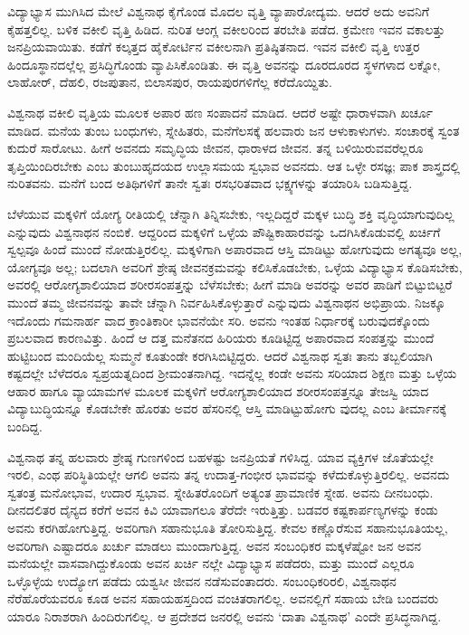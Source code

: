 ವಿದ್ಯಾಭ್ಯಾಸ ಮುಗಿಸಿದ ಮೇಲೆ ವಿಶ್ವನಾಥ ಕೈಗೊಂಡ ಮೊದಲ ವೃತ್ತಿ ವ್ಯಾಪಾರೋದ್ಯಮ. ಆದರೆ ಅದು ಅವನಿಗೆ ಕೈಹತ್ತಲಿಲ್ಲ. ಬಳಿಕ ವಕೀಲಿ ವೃತ್ತಿ ಹಿಡಿದ. ನುರಿತ ಆಂಗ್ಲ ವಕೀಲರಿಂದ ತರಬೇತಿ ಪಡೆದ. ಕ್ರಮೇಣ ಇವನ ವಕಾಲತ್ತು ಜನಪ್ರಿಯವಾಯಿತು. ಕಡೆಗೆ ಕಲ್ಕತ್ತದ ಹೈಕೋರ್ಟಿನ ವಕೀಲನಾಗಿ ಪ್ರತಿಷ್ಠಿತನಾದ. ಇವನ ವಕೀಲಿ ವೃತ್ತಿ ಉತ್ತರ ಹಿಂದೂಸ್ಥಾನದಲ್ಲೆಲ್ಲ ಪ್ರಸಿದ್ಧಿಗೊಂಡು ವ್ಯಾಪಿಸಿಕೊಂಡಿತು. ಈ ವೃತ್ತಿ ಅವನನ್ನು ದೂರದೂರದ ಸ್ಥಳಗಳಾದ ಲಕ್ನೋ, ಲಾಹೋರ್, ದೆಹಲಿ, ರಜಪುತಾನ, ಬಿಲಾಸಪುರ, ರಾಯಪುರಗಳಿಗೆಲ್ಲ ಕರೆದೊಯ್ದಿತು.

ವಿಶ್ವನಾಥ ವಕೀಲಿ ವೃತ್ತಿಯ ಮೂಲಕ ಅಪಾರ ಹಣ ಸಂಪಾದನೆ ಮಾಡಿದ. ಆದರೆ ಅಷ್ಟೇ ಧಾರಾಳವಾಗಿ ಖರ್ಚೂ ಮಾಡಿದ. ಮನೆಯ ತುಂಬ ಬಂಧುಗಳು, ಸ್ನೇಹಿತರು, ಮನೆಗೆಲಸಕ್ಕೆ ಹಲವಾರು ಜನ ಆಳುಕಾಳುಗಳು. ಸಂಚಾರಕ್ಕೆ ಸ್ವಂತ ಕುದುರೆ ಸಾರೋಟು. ಹೀಗೆ ಅವನದು ಸಮೃದ್ಧಿಯ ಜೀವನ, ಧಾರಾಳದ ಜೀವನ. ತನ್ನ ಬಳಿಯಿರುವವರೆಲ್ಲರೂ ತೃಪ್ತಿಯಿಂದಿರಬೇಕು ಎಂಬ ತುಂಬುಹೃದಯದ ಉಲ್ಲಾಸಮಯ ಸ್ವಭಾವ ಅವನದು. ಆತ ಒಳ್ಳೇ ರಸಜ್ಞ; ಪಾಕ ಶಾಸ್ತ್ರದಲ್ಲಿ ನುರಿತವನು. ಮನೆಗೆ ಬಂದ ಅತಿಥಿಗಳಿಗೆ ತಾನೇ ಸ್ವತಃ ರಸಭರಿತವಾದ ಭಕ್ಷ್ಯಗಳನ್ನು ತಯಾರಿಸಿ ಬಡಿಸುತ್ತಿದ್ದ.

ಬೆಳೆಯುವ ಮಕ್ಕಳಿಗೆ ಯೋಗ್ಯ ರೀತಿಯಲ್ಲಿ ಚೆನ್ನಾಗಿ ತಿನ್ನಿಸಬೇಕು, ಇಲ್ಲದಿದ್ದರೆ ಮಕ್ಕಳ ಬುದ್ಧಿ ಶಕ್ತಿ ವೃದ್ಧಿಯಾಗುವುದಿಲ್ಲ ಎನ್ನುವುದು ವಿಶ್ವನಾಥನ ನಂಬಿಕೆ. ಆದ್ದರಿಂದ ಮಕ್ಕಳಿಗೆ ಒಳ್ಳೆಯ ಪೌಷ್ಟಿಕಾಹಾರವನ್ನು ಒದಗಿಸಿಕೊಡುವಲ್ಲಿ ಖರ್ಚಿಗೆ ಸ್ವಲ್ಪವೂ ಹಿಂದೆ ಮುಂದೆ ನೋಡುತ್ತಿರಲಿಲ್ಲ. ಮಕ್ಕಳಿಗಾಗಿ ಅಪಾರವಾದ ಆಸ್ತಿ ಮಾಡಿಟ್ಟು ಹೋಗುವುದು ಅಗತ್ಯವೂ ಅಲ್ಲ, ಯೋಗ್ಯವೂ ಅಲ್ಲ; ಬದಲಾಗಿ ಅವರಿಗೆ ಶ್ರೇಷ್ಠ ಜೀವನಕ್ರಮವನ್ನು ಕಲಿಸಿಕೊಡಬೇಕು, ಒಳ್ಳೆಯ ವಿದ್ಯಾಭ್ಯಾಸ ಕೊಡಿಸಬೇಕು, ಅವರಲ್ಲಿ ಆರೋಗ್ಯಶಾಲಿಯಾದ ಶರೀರಸಂಪತ್ತನ್ನು ಬೆಳೆಸಬೇಕು; ಹೀಗೆ ಮಾಡಿ ಅವರನ್ನು ಅವರ ಪಾಡಿಗೆ ಬಿಟ್ಟುಬಿಟ್ಟರೆ ಮುಂದೆ ತಮ್ಮ ಜೀವನವನ್ನು ತಾವೇ ಚೆನ್ನಾಗಿ ನಿರ್ವಹಿಸಿಕೊಳ್ಳುತ್ತಾರೆ ಎನ್ನುವುದು ವಿಶ್ವನಾಥನ ಅಭಿಪ್ರಾಯ. ನಿಜಕ್ಕೂ ಇದೊಂದು ಗಮನಾರ್ಹ ವಾದ ಕ್ರಾಂತಿಕಾರೀ ಭಾವನೆಯೇ ಸರಿ. ಅವನು ಇಂತಹ ನಿರ್ಧಾರಕ್ಕೆ ಬರುವುದಕ್ಕೊಂದು ಪ್ರಬಲವಾದ ಕಾರಣವಿತ್ತು. ಹಿಂದೆ ಆ ದತ್ತ ಮನೆತನದ ಹಿರಿಯರು ಕೂಡಿಟ್ಟಿದ್ದ ಅಪಾರವಾದ ಸಂಪತ್ತನ್ನು ಮುಂದೆ ಹುಟ್ಟಿಬಂದ ಮಂದಿಯೆಲ್ಲ ಸುಮ್ಮನೆ ಕೂತುಂಡೇ ಕರಗಿಸಿಬಿಟ್ಟಿದ್ದರು. ಆದರೆ ವಿಶ್ವನಾಥ ಸ್ವತಃ ತಾನು ತಬ್ಬಲಿಯಾಗಿ ಕಷ್ಟದಲ್ಲೇ ಬೆಳೆದರೂ ಸ್ವಪ್ರಯತ್ನದಿಂದ ಶ್ರೀಮಂತನಾಗಿದ್ದ. ಇದನ್ನೆಲ್ಲ ಕಂಡೇ ಅವನು ಸರಿಯಾದ ಶಿಕ್ಷಣ ಮತ್ತು ಒಳ್ಳೆಯ ಆಹಾರ ಹಾಗೂ ವ್ಯಾಯಾಮಗಳ ಮೂಲಕ ಮಕ್ಕಳಿಗೆ ಆರೋಗ್ಯಶಾಲಿಯಾದ ಶರೀರಸಂಪತ್ತನ್ನೂ ತೇಜಸ್ವಿ ಯಾದ ವಿದ್ಯಾಬುದ್ಧಿಯನ್ನೂ ಕೊಡಬೇಕೇ ಹೊರತು ಅವರ ಹೆಸರಿನಲ್ಲಿ ಆಸ್ತಿ ಮಾಡಿಟ್ಟುಹೋಗು ವುದಲ್ಲ ಎಂಬ ತೀರ್ಮಾನಕ್ಕೆ ಬಂದಿದ್ದ.

ವಿಶ್ವನಾಥ ತನ್ನ ಹಲವಾರು ಶ್ರೇಷ್ಠ ಗುಣಗಳಿಂದ ಬಹಳಷ್ಟು ಜನಪ್ರಿಯತೆ ಗಳಿಸಿದ್ದ. ಯಾವ ವ್ಯಕ್ತಿಗಳ ಜೊತೆಯಲ್ಲೇ ಇರಲಿ, ಎಂಥ ಪರಿಸ್ಥಿತಿಯಲ್ಲೇ ಆಗಲಿ ಅವನು ತನ್ನ ಉದಾತ್ತ-ಗಂಭೀರ ಭಾವವನ್ನು ಕಳೆದುಕೊಳ್ಳುತ್ತಿರಲಿಲ್ಲ. ಅವನದು ಸ್ವತಂತ್ರ ಮನೋಭಾವ, ಉದಾರ ಸ್ವಭಾವ. ಸ್ನೇಹಿತರೊಂದಿಗೆ ಅತ್ಯಂತ ಪ್ರಾಮಾಣಿಕ ಸ್ನೇಹ. ಅವನು ದೀನಬಂಧು. ದೀನದಲಿತರ ದೈನ್ಯದ ಕರೆಗೆ ಅವನ ಕಿವಿ ಯಾವಾಗಲೂ ತೆರೆದೇ ಇರುತ್ತಿತ್ತು. ಬಡವರ ಕಷ್ಟಕಾರ್ಪಣ್ಯಗಳನ್ನು ಕಂಡು ಅವನು ಕರಗಿಹೋಗುತ್ತಿದ್ದ. ಅವರಿಗಾಗಿ ಸಹಾನುಭೂತಿ ತೋರಿಸುತ್ತಿದ್ದ. ಕೇವಲ ಕಣ್ಣೊರೆಸುವ ಸಹಾನುಭೂತಿಯಲ್ಲ, ಅವರಿಗಾಗಿ ಎಷ್ಟಾದರೂ ಖರ್ಚು ಮಾಡಲು ಮುಂದಾಗುತ್ತಿದ್ದ. ಅವನ ಸಂಬಂಧಿಕರ ಮಕ್ಕಳೆಷ್ಟೋ ಜನ ಅವನ ಮನೆಯಲ್ಲೇ ವಾಸವಾಗಿದ್ದುಕೊಂಡು ಅವನ ಖರ್ಚಿ ನಲ್ಲೇ ವಿದ್ಯಾಭ್ಯಾಸ ಪಡೆದರು, ಮತ್ತು ಮುಂದೆ ಎಲ್ಲರೂ ಒಳ್ಳೊಳ್ಳೆಯ ಉದ್ಯೋಗ ಪಡೆದು ಯಶ್ವಸೀ ಜೀವನ ನಡೆಸುವಂತಾದರು. ಸಂಬಂಧಿಕರಿರಲಿ, ವಿಶ್ವನಾಥನ ನೆರೆಹೊರೆಯವರೂ ಕೂಡ ಅವನ ಸಹಾಯಹಸ್ತದಿಂದ ವಂಚಿತರಾಗಲಿಲ್ಲ. ಅವನಲ್ಲಿಗೆ ಸಹಾಯ ಬೇಡಿ ಬಂದವರು ಯಾರೂ ನಿರಾಶರಾಗಿ ಹಿಂದಿರುಗಲಿಲ್ಲ. ಆ ಪ್ರದೇಶದ ಜನರಲ್ಲಿ ಅವನು ‘ದಾತಾ ವಿಶ್ವನಾಥ’ ಎಂದೇ ಪ್ರಸಿದ್ಧನಾಗಿದ್ದ.

